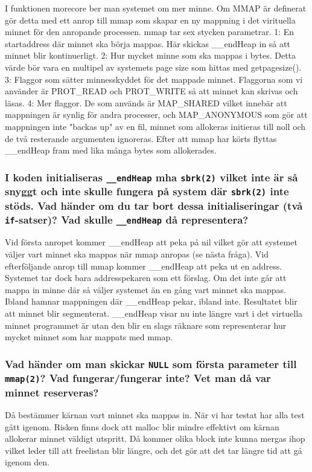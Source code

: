 \documentclass[a4paper]{article}
\begin{document}
I funktionen morecore ber man systemet om mer minne. Om MMAP är definerat gör detta med ett anrop till mmap som skapar en ny mappning i det virituella minnet för den anropande processen. mmap tar sex stycken parametrar. 1: En startaddress där minnet ska börja mappas. Här skickas __endHeap in så att minnet blir kontinuerligt. 2: Hur mycket minne som ska mappas i bytes. Detta värde bör vara en multipel av systemets page size som hittas med getpagesize(). 3: Flaggor som sätter minnesskyddet för det mappade minnet. Flaggorna som vi använder är PROT_READ och PROT_WRITE så att minnet kan skrivas och läsas. 4: Mer flaggor. De som används är MAP_SHARED vilket innebär att mappningen är synlig för andra processer, och MAP_ANONYMOUS som gör att mappningen inte "backas up" av en fil, minnet som allokeras initieras till noll och de två resterande argumenten ignoreras. Efter att mmap har körts flyttas __endHeap fram med lika många bytes som allokerades.

\subsubsection*{I koden initialiseras \texttt{\_\_endHeap} mha \texttt{sbrk(2)} vilket inte är så snyggt och inte skulle fungera på system där \texttt{sbrk(2)} inte stöds. Vad händer om du tar bort dessa initialiseringar (två \texttt{if}-satser)? Vad skulle \texttt{\_\_endHeap} då representera?}
Vid första anropet kommer __endHeap att peka på nil vilket gör att systemet väljer vart minnet ska mappas när mmap anropas (se nästa fråga). Vid efterföljande anrop till mmap kommer __endHeap att peka ut en address. Systemet tar dock bara addresspekaren som ett förslag. Om det inte går att mappa in minne där så väljer systemet än en gång vart minnet ska mappas. Ibland hamnar mappningen där __endHeap pekar, ibland inte. Resultatet blir att minnet blir segmenterat. __endHeap visar nu inte längre vart i det virtuella minnet programmet är utan den blir en slags räknare som representerar hur mycket minnet som har mappats med mmap.

\subsubsection*{Vad händer om man skickar \texttt{NULL} som första parameter till \texttt{mmap(2)}? Vad fungerar/fungerar inte? Vet man då var minnet reserveras?}
Då bestämmer kärnan vart minnet ska mappas in. När vi har testat har alla test gått igenom. Risken finns dock att malloc blir mindre effektivt om kärnan allokerar minnet väldigt utspritt. Då kommer olika block inte kunna mergas ihop vilket leder till att freelistan blir längre, och det gör att det tar längre tid att gå igenom den.
\end{document}
